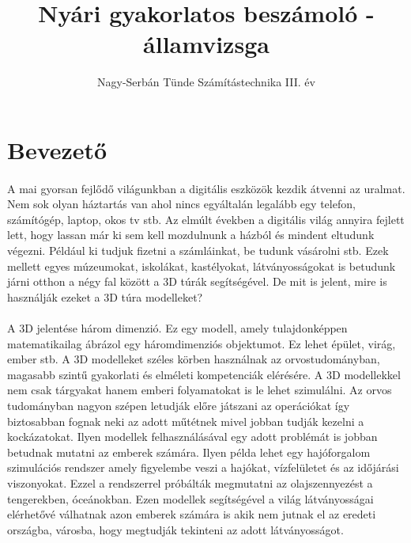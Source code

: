 \documentclass{article}
\begin{document}
	\title{Nyári gyakorlatos beszámoló - államvizsga}
	\author{Nagy-Serbán Tünde Számítástechnika III. év}
	\maketitle
	
	\newpage
	
	\tableofcontents
	
	\listoffigures
	
	\listoftables
	
	\newpage
	
	\section{Bevezető}
	\label{sec:bevezeto}
	\paragraph{}
	A mai gyorsan fejlődő világunkban a digitális eszközök kezdik átvenni az uralmat. Nem sok olyan háztartás van ahol nincs egyáltalán legalább egy telefon, számítógép, laptop, okos tv stb. Az elmúlt években a digitális világ annyira fejlett lett, hogy lassan már ki sem kell mozdulnunk a házból és mindent eltudunk végezni. Például ki tudjuk fizetni a számláinkat, be tudunk vásárolni stb. Ezek mellett egyes múzeumokat, iskolákat, kastélyokat, látványosságokat is betudunk járni otthon a négy fal között a 3D túrák segítségével. De mit is jelent, mire is használják ezeket a 3D túra modelleket?
	\paragraph{}
	A 3D jelentése három dimenzió. Ez egy modell, amely tulajdonképpen matematikailag ábrázol egy háromdimenziós objektumot. Ez lehet épület, virág, ember stb. A 3D modelleket széles körben használnak az orvostudományban, magasabb szintű gyakorlati és elméleti kompetenciák elérésére. A 3D modellekkel nem csak tárgyakat hanem emberi folyamatokat is le lehet szimulálni. Az orvos tudományban nagyon szépen letudják előre játszani az operációkat így biztosabban fognak neki az adott műtétnek mivel jobban tudják kezelni a kockázatokat. Ilyen modellek felhasználásával egy adott problémát is jobban betudnak mutatni az emberek számára. Ilyen példa lehet egy hajóforgalom szimulációs rendszer amely figyelembe veszi a hajókat, vízfelületet és az időjárási viszonyokat. Ezzel a rendszerrel \cite{dedov2017design} próbálták megmutatni az olajszennyezést a tengerekben, óceánokban. Ezen modellek segítségével a világ látványosságai elérhetővé válhatnak azon emberek számára is akik nem jutnak el az eredeti országba, városba, hogy megtudják tekinteni az adott látványosságot.
\end{document}
